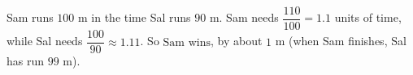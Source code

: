 Sam runs $100$ m in the time Sal runs $90$ m. Sam needs $\dfrac{110}{100}=1.1$ units of time, while Sal needs $\dfrac{100}{90}\approx1.11$. So $\boxed{\text{Sam wins}}$, by about $1$ m (when Sam finishes, Sal has run $99$ m).
